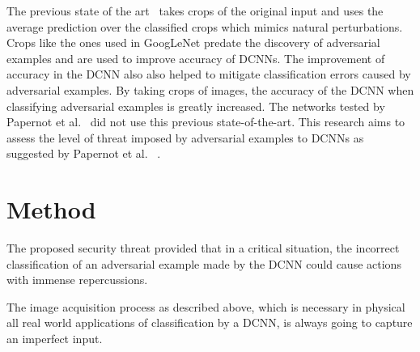 \documentclass[conference]{IEEEtran}
\begin{document}
The previous state of the art~\cite{c18} takes crops of the original input and uses the average prediction over the classified crops which mimics natural perturbations.  Crops like the ones used in GoogLeNet predate the discovery of adversarial examples and are used to improve accuracy of DCNNs.  The improvement of accuracy in the DCNN also also helped to mitigate classification errors caused by adversarial examples.  By taking crops of images, the accuracy of the DCNN when classifying adversarial examples is greatly increased.  The networks tested by Papernot et al.~\cite{c3} did not use this previous state-of-the-art.  This research aims to assess the level of threat imposed by adversarial examples to DCNNs as suggested by Papernot et al. ~\cite{c3}. 

\section{Method}
 The proposed security threat provided that in a critical situation, the incorrect classification of an adversarial example made by the DCNN could cause actions with immense repercussions.
 
The image acquisition process as described above, which is necessary in physical all real world applications of classification by a DCNN, is always going to capture an imperfect input.
\end{document}
